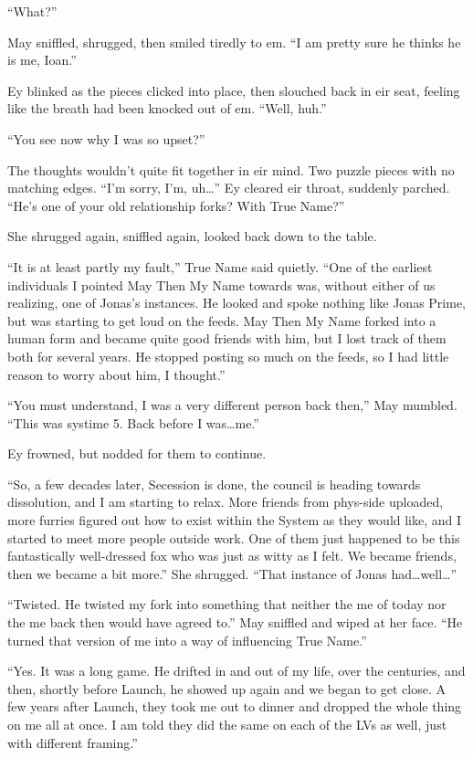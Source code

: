 ``What?''

May sniffled, shrugged, then smiled tiredly to em. ``I am pretty sure he thinks he is me, Ioan.''

Ey blinked as the pieces clicked into place, then slouched back in eir seat, feeling like the breath had been knocked out of em. ``Well, huh.''

``You see now why I was so upset?''

The thoughts wouldn't quite fit together in eir mind. Two puzzle pieces with no matching edges. ``I'm sorry, I'm, uh\ldots{}'' Ey cleared eir throat, suddenly parched. ``He's one of your old relationship forks? With True Name?''

She shrugged again, sniffled again, looked back down to the table.

``It is at least partly my fault,'' True Name said quietly. ``One of the earliest individuals I pointed May Then My Name towards was, without either of us realizing, one of Jonas's instances. He looked and spoke nothing like Jonas Prime, but was starting to get loud on the feeds. May Then My Name forked into a human form and became quite good friends with him, but I lost track of them both for several years. He stopped posting so much on the feeds, so I had little reason to worry about him, I thought.''

``You must understand, I was a very different person back then,'' May mumbled. ``This was systime 5. Back before I was\ldots me.''

Ey frowned, but nodded for them to continue.

``So, a few decades later, Secession is done, the council is heading towards dissolution, and I am starting to relax. More friends from phys-side uploaded, more furries figured out how to exist within the System as they would like, and I started to meet more people outside work. One of them just happened to be this fantastically well-dressed fox who was just as witty as I felt. We became friends, then we became a bit more.'' She shrugged. ``That instance of Jonas had\ldots well\ldots{}''

``Twisted. He twisted my fork into something that neither the me of today nor the me back then would have agreed to.'' May sniffled and wiped at her face. ``He turned that version of me into a way of influencing True Name.''

``Yes. It was a long game. He drifted in and out of my life, over the centuries, and then, shortly before Launch, he showed up again and we began to get close. A few years after Launch, they took me out to dinner and dropped the whole thing on me all at once. I am told they did the same on each of the LVs as well, just with different framing.''

